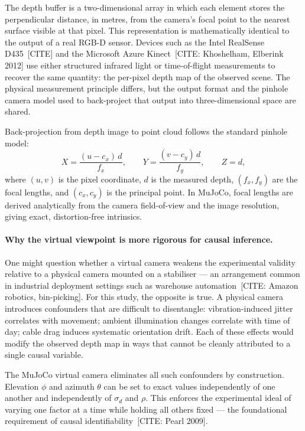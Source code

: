 \documentclass[journal]{IEEEtran}
\begin{document}
The depth buffer is a two-dimensional array in which each element stores the
perpendicular distance, in metres, from the camera's focal point to the
nearest surface visible at that pixel.  This representation is
mathematically identical to the output of a real RGB-D sensor.  Devices
such as the Intel RealSense D435~[CITE] and the Microsoft Azure
Kinect~[CITE: Khoshelham, Elberink 2012] use either structured infrared
light or time-of-flight measurements to recover the same quantity: the
per-pixel depth map of the observed scene.  The physical measurement
principle differs, but the output format and the pinhole camera model used
to back-project that output into three-dimensional space are shared.

Back-projection from depth image to point cloud follows the standard pinhole
model:
\begin{equation}
  X = \frac{(u - c_x)\,d}{f_x}, \qquad
  Y = \frac{(v - c_y)\,d}{f_y}, \qquad
  Z = d,
  \label{eq:backproject}
\end{equation}
where $(u,v)$ is the pixel coordinate, $d$ is the measured depth,
$(f_x, f_y)$ are the focal lengths, and $(c_x, c_y)$ is the principal
point.  In MuJoCo, focal lengths are derived analytically from the
camera field-of-view and the image resolution, giving exact,
distortion-free intrinsics.

\paragraph{Why the virtual viewpoint is more rigorous for causal inference.}
One might question whether a virtual camera weakens the experimental
validity relative to a physical camera mounted on a stabiliser --- an
arrangement common in industrial deployment settings such as warehouse
automation~[CITE: Amazon robotics, bin-picking].  For this study, the
opposite is true.  A physical camera introduces confounders that are
difficult to disentangle: vibration-induced jitter correlates with movement;
ambient illumination changes correlate with time of day; cable drag induces
systematic orientation drift.  Each of these effects would modify the
observed depth map in ways that cannot be cleanly attributed to a single
causal variable.

The MuJoCo virtual camera eliminates all such confounders by construction.
Elevation $\phi$ and azimuth $\theta$ can be set to exact values
independently of one another and independently of $\sigma_d$ and $\rho$.
This enforces the experimental ideal of varying one factor at a time while
holding all others fixed --- the foundational requirement of causal
identifiability~[CITE: Pearl 2009].
\end{document}
